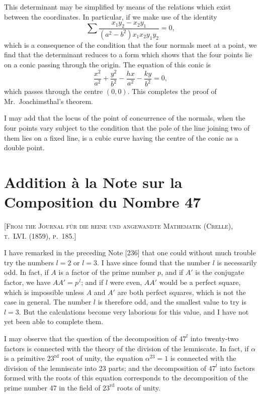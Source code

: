 \documentclass[11pt,a4paper]{book}
\begin{document}
\setcounter{page}{78}

This determinant may be simplified by means of the relations which exist between the coordinates. In particular, if we make use of the identity
\[
\sum \frac{x_1y_2 - x_2y_1}{(a^2-b^2)x_1x_2y_1y_2} = 0,
\]
which is a consequence of the condition that the four normals meet at a point, we find that the determinant reduces to a form which shows that the four points lie on a conic passing through the origin. The equation of this conic is
\[
\frac{x^2}{a^2} + \frac{y^2}{b^2} - \frac{hx}{a^2} - \frac{ky}{b^2} = 0,
\]
which passes through the centre $(0,0)$. This completes the proof of Mr.~Joachimsthal's theorem.

I may add that the locus of the point of concurrence of the normals, when the four points vary subject to the condition that the pole of the line joining two of them lies on a fixed line, is a cubic curve having the centre of the conic as a double point.

\newpage



\section{Addition à la Note sur la Composition du Nombre 47}

\textsc{[From the Journal für die reine und angewandte Mathematik (Crelle), t.~LVI. (1859), p.~185.]}
\label{paper:239}

\setcounter{page}{79}

I have remarked in the preceding Note [236] that one could without much trouble try the numbers $l=2$ or $l=3$. I have since found that the number $l$ is necessarily odd. In fact, if $A$ is a factor of the prime number $p$, and if $A'$ is the conjugate factor, we have $AA'=p^{\,l}$; and if $l$ were even, $AA'$ would be a perfect square, which is impossible unless $A$ and $A'$ are both perfect squares, which is not the case in general. The number $l$ is therefore odd, and the smallest value to try is $l=3$. But the calculations become very laborious for this value, and I have not yet been able to complete them.

\setcounter{page}{80}

I may observe that the question of the decomposition of $47^l$ into twenty-two factors is connected with the theory of the division of the lemniscate. In fact, if $\alpha$ is a primitive $23^{\text{rd}}$ root of unity, the equation $\alpha^{23}=1$ is connected with the division of the lemniscate into 23 parts; and the decomposition of $47^l$ into factors formed with the roots of this equation corresponds to the decomposition of the prime number 47 in the field of $23^{\text{rd}}$ roots of unity.
\end{document}
